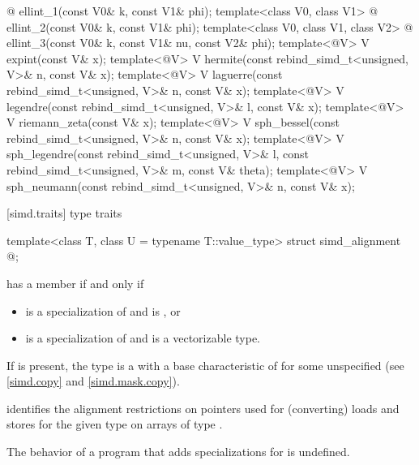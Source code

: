 \begin{codeblock}
{    @ ellint_1(const V0& k, const V1& phi);
  template<class V0, class V1>
    @ ellint_2(const V0& k, const V1& phi);
  template<class V0, class V1, class V2>
    @ ellint_3(const V0& k, const V1& nu, const V2& phi);
  template<@\mathfloatingpoint@ V> V expint(const V& x);
  template<@\mathfloatingpoint@ V> V hermite(const rebind_simd_t<unsigned, V>& n, const V& x);
  template<@\mathfloatingpoint@ V> V laguerre(const rebind_simd_t<unsigned, V>& n, const V& x);
  template<@\mathfloatingpoint@ V> V legendre(const rebind_simd_t<unsigned, V>& l, const V& x);
  template<@\mathfloatingpoint@ V> V riemann_zeta(const V& x);
  template<@\mathfloatingpoint@ V> V sph_bessel(const rebind_simd_t<unsigned, V>& n, const V& x);
  template<@\mathfloatingpoint@ V>
    V sph_legendre(const rebind_simd_t<unsigned, V>& l, const rebind_simd_t<unsigned, V>& m,
                   const V& theta);
  template<@\mathfloatingpoint@ V> V sph_neumann(const rebind_simd_t<unsigned, V>& n, const V& x);
}
\end{codeblock}

[simd.traits]{ type traits}

\begin{itemdecl}
template<class T, class U = typename T::value_type> struct simd_alignment { @\seebelow@ };
\end{itemdecl}

\begin{itemdescr}
\pnum
{} has a member  if and only if
\begin{itemize}
  \item {} is a specialization of  and  is , or
  \item {} is a specialization of  and  is a vectorizable type.
\end{itemize}

\pnum
If  is present, the type  is a  with
a base characteristic of  for some unspecified
 (see \ref{simd.copy} and \ref{simd.mask.copy}). \begin{note} identifies the
alignment restrictions on pointers used for (converting) loads and stores for the given type
 on arrays of type .\end{note}

\pnum
The behavior of a program that adds specializations for  is undefined.
\end{itemdescr}

